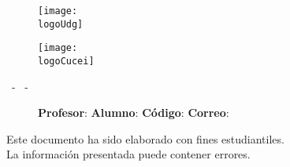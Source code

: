 



    \begin{titlepage}
        \centering
        {\huge\textbf{\universidad}}\par
        \vspace{0.6cm}
        {\LARGE{\cede}}
        \vfill

        \begin{figure}[h]
            \begin{minipage}[t]{0.45\textwidth}
                \centering
                \texttt{[image: \\logoUdg]}
            \end{minipage}
            \hfill
            \begin{minipage}[t]{0.45\textwidth}
                \centering
                \texttt{[image: \\logoCucei]}
            \end{minipage}
        \end{figure}
        \vfill

        \Large{ \division\vfill \textbf{\carrera}\vfill \textbf{\materia}\par\vspace{3pt} \seccion\ - \clave\ - \nrc\vfill }

        {\LARGE{\textbf{\theTitle}}}
        \vfill

		\begin{figure}[h]
			\centering
			\begin{minipage}[t]{0.61\textwidth}
				{\Large
					\textbf{Profesor}: \profesor\nl
					\textbf{Alumno}: \theAuthor\nl
					\textbf{Código}: \theAuthorCode\nl
					\textbf{Correo}: \theAuthorMail}
			\end{minipage}
		\end{figure}
		\vfill

        \begin{tcolorbox}
            [colback=red!5!white, colframe=red!75!black]
            \centering
			Este documento ha sido elaborado con fines estudiantiles.\\
			La información presentada puede contener errores.
        \end{tcolorbox}
        \vfill
        {\large \startDate}\par
    \end{titlepage}

